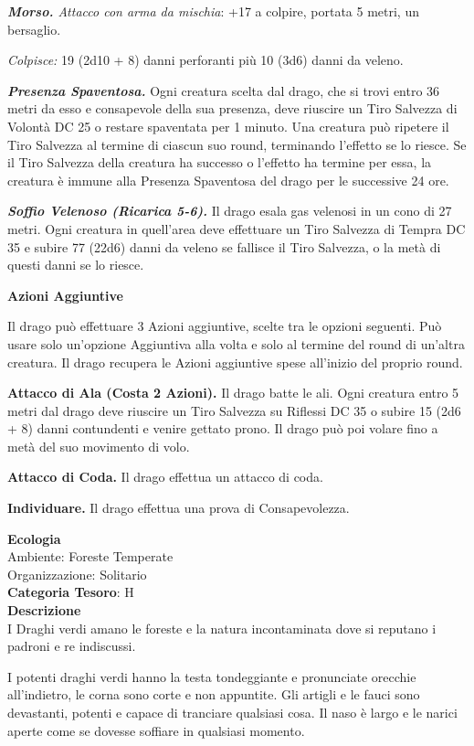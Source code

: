 \begin{multicols}{2}
{\emph{\textbf{Morso.} Attacco con arma da mischia}: +17 a colpire, portata 5 metri, un bersaglio.

\emph{Colpisce:} 19 (2d10 + 8) danni perforanti più 10 (3d6) danni da veleno.

\emph{\textbf{Presenza Spaventosa.}} Ogni creatura scelta dal drago, che si trovi entro 36 metri da esso e consapevole della sua presenza, deve riuscire un Tiro Salvezza di Volontà DC 25 o restare spaventata per 1 minuto. Una creatura può ripetere il Tiro Salvezza al termine di ciascun suo round, terminando l'effetto se lo riesce. Se il Tiro Salvezza della creatura ha successo o l'effetto ha termine per essa, la creatura è immune alla Presenza Spaventosa del drago per le successive 24 ore.

\emph{\textbf{Soffio Velenoso (Ricarica 5-6).}} Il drago esala gas velenosi in un cono di 27 metri. Ogni creatura in quell'area deve effettuare un Tiro Salvezza di Tempra DC 35 e subire 77 (22d6) danni da veleno se fallisce il Tiro Salvezza, o la metà di questi danni se lo riesce.

\textbf{Azioni Aggiuntive}

Il drago può effettuare 3 Azioni aggiuntive, scelte tra le opzioni seguenti. Può usare solo un'opzione Aggiuntiva alla volta e solo al termine del round di un'altra creatura. Il drago recupera le Azioni aggiuntive spese all'inizio del proprio round.

\textbf{Attacco di Ala (Costa 2 Azioni).} Il drago batte le ali. Ogni creatura entro 5 metri dal drago deve riuscire un Tiro Salvezza su Riflessi DC 35 o subire 15 (2d6 + 8) danni contundenti e venire gettato prono. Il drago può poi volare fino a metà del suo movimento di volo.

\textbf{Attacco di Coda.} Il drago effettua un attacco di coda.

\textbf{Individuare.} Il drago effettua una prova di Consapevolezza.

\textbf{Ecologia}\\
Ambiente: Foreste Temperate\\
Organizzazione: Solitario\\
\textbf{Categoria Tesoro}: H\\
\textbf{Descrizione}\\
I Draghi verdi amano le foreste e la natura incontaminata dove si reputano i padroni e re indiscussi.

I potenti draghi verdi hanno la testa tondeggiante e pronunciate orecchie all'indietro, le corna sono corte e non appuntite.
Gli artigli e le fauci sono devastanti, potenti e capace di tranciare qualsiasi cosa.
Il naso è largo e le narici aperte come se dovesse soffiare in qualsiasi momento.

}
\end{multicols}
